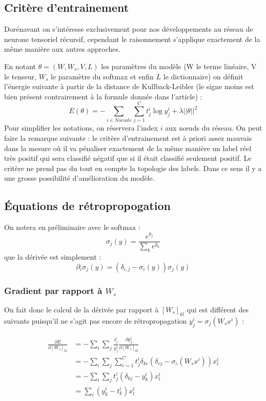 \documentclass[conference]{IEEEtran}
\begin{document}
\subsection{Critère d'entrainement}
Dorénavant on s'intéresse exclusivement pour nos développements au réseau de neurone tensoriel récursif, cependant le raisonnement s'applique exactement de la même manière aux autres approches.

En notant $\theta=(W,W_s,V,L)$ les paramètres du modèle (W le terme linéaire, V le tenseur, $W_s$ le paramètre du softmax et enfin $L$ le dictionnaire) on définit l'énergie suivante à partir de la distance de Kullback-Leibler (le signe moins est bien présent contrairement à la formule donnée dans l'article) :
$$E(\theta)=-\sum_{i\in Noeuds}\sum_{j=1}^C t^i_j\log y^i_j+\lambda ||\theta||^2$$
Pour simplifier les notations, on réservera l'index $i$ aux nœuds du réseau.
On peut faire la remarque suivante : le critère d'entrainement est à priori assez mauvais dans la mesure où il va pénaliser exactement de la même manière un label réel très positif qui sera classifié négatif que si il était classifié seulement positif. Le critère ne prend pas du tout en compte la topologie des labels. Dans ce sens il y a une grosse possibilité d'amélioration du modèle.

\subsection{Équations de rétropropogation}
On notera en préliminaire avec le softmax :
$$\sigma_j(y)=\frac{e^{y_j}}{\sum_ k e^{y_k}}$$
que la dérivée est simplement :
$$\partial_i\sigma_j(y)=(\delta_{i,j}-\sigma_i(y))\sigma_j(y)$$

\subsubsection{Gradient par rapport à $W_s$}
On fait donc le calcul de la dérivée par rapport à $[W_s]_{kl}$ qui est différent des suivants puisqu'il ne s'agit pas encore de rétropropagation $y^i_j=\sigma_j(W_s x^i)$ :

\begin{align*}
\frac{\partial E}{\partial [W_s]_{kl}}&=-\sum_{i}\sum_j \frac{t_j^i}{y_j^i} \frac{\partial y_j^i}{\partial [W_s]_{kl}}\\
&=-\sum_i\sum_j \sum_{c=1}^C t_j^i\delta_{kc}(\delta_{cj}-\sigma_c(W_s x^i))x^i_l\\
&=-\sum_i\sum_j t_j^i (\delta_{kj}-y_k^i)x_l^i\\
&= \sum_i (y_k^i -t_k^i) x_l^i
\end{align*}
\end{document}
